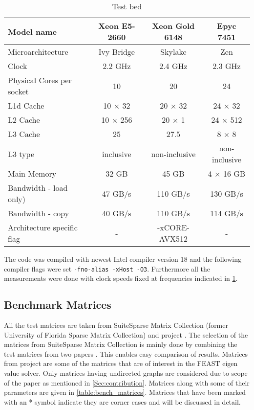 \begin{table}[tbhp]
\footnotesize
\caption{Test bed}\label{tab:test_bed}
\begin{center}
	\begin{tabular}{|l| c  c c |}
		\toprule
		{Model name} & {Xeon\textsuperscript{\textregistered} E5-2660} & {Xeon\textsuperscript{\textregistered} Gold 6148} & { Epyc 7451 } \\
		\midrule
		{Microarchitecture} & {Ivy Bridge} & {Skylake} & {Zen} \\
		\midrule
		{Clock} & {2.2 GHz} & {2.4 GHz} & {2.3 GHz}\\
		{Physical Cores per socket} & {10} & {20} & {24}\\
		{L1d Cache} & {10 $\times$ 32 \KB} & {20 $\times$ 32 \KB} & {24 $\times$  32 \KB}\\
		{L2 Cache} & {10 $\times$ 256 \KB} & {20 $\times$ 1 \MB} & {24 $\times$ 512 \MB }\\
		{L3 Cache} & {25 \MB} & {27.5 \MB} & {8 $\times$ 8 \MB}\\
		{L3 type} & {inclusive} & {non-inclusive} & {non-inclusive}\\
		{Main Memory} & {32 GB} & {45 GB} & {4 $\times$ 16 GB}\\
		{Bandwidth - load only)} & {47 GB/s} & {110 GB/s} & {130 GB/s }\\ %
		{Bandwidth - copy} & {40 GB/s} & {110 GB/s} & {114 GB/s }\\
		{Architecture specific flag} & {-} & {-xCORE-AVX512} & {-}\\
		\bottomrule
	\end{tabular}
\end{center}
\end{table} 

The code was compiled with newest Intel compiler version 18 and the following compiler flags were set {\tt -fno-alias -xHost -O3}. Furthermore all the measurements were done with  \CPU clock speeds fixed at frequencies indicated in \cref{tab:test_bed}.

\subsection{Benchmark Matrices}
All the test matrices are taken from SuiteSparse Matrix Collection (former University of Florida Sparse Matrix Collection) \cite{UOF} and \ESSEX project \cite{ESSEX}. The selection of the matrices from SuiteSparse Matrix Collection is  mainly done by combining the test matrices from two papers \cite{RSB,park_ls}. This enables easy comparison of results. Matrices from \ESSEX project are some of the matrices that are of interest in the FEAST eigen value solver.  Only matrices having undirected graphs are considered due to scope of the paper as mentioned in \cref{Sec:contribution}. Matrices along with some of their parameters are given in \cref{table:bench_matrices}.  Matrices that have been marked with an * symbol indicate they are corner cases and will be discussed in detail.

